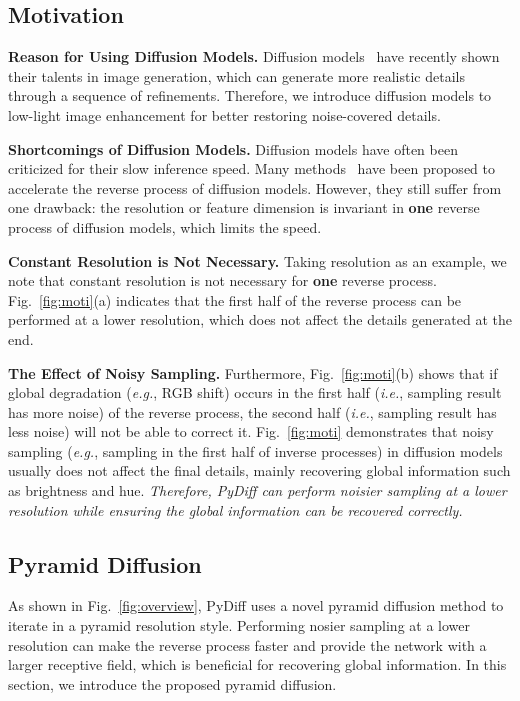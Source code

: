 \documentclass{article}
\def\eg{\emph{e.g.}}
\def\ie{\emph{i.e.}}
\begin{document}
\subsection{Motivation}
\label{PyDiff_moti}
\noindent \textbf{Reason for Using Diffusion Models.}
Diffusion models~\cite{ho2020denoising,song2020score} have recently shown their talents in image generation, which can generate more realistic details through a sequence of refinements. Therefore, we introduce diffusion models to low-light image enhancement for better restoring noise-covered details.



\noindent \textbf{Shortcomings of Diffusion Models.}
Diffusion models have often been criticized for their slow inference speed. Many methods~\cite{song2020denoising,nichol2021improved,ho2022cascaded,saharia2022image} have been proposed to accelerate the reverse process of diffusion models. However, they still suffer from one drawback: the resolution or feature dimension is invariant in \textbf{one} reverse process of diffusion models, which limits the speed.


\noindent \textbf{Constant Resolution is Not Necessary.}
Taking resolution as an example, we note that constant resolution is not necessary for \textbf{one} reverse process. Fig.~\ref{fig:moti}(a) indicates that the first half of the reverse process can be performed at a lower resolution, which does not affect the details generated at the end. 

\noindent \textbf{The Effect of Noisy Sampling.}
Furthermore, Fig.~\ref{fig:moti}(b) shows that if global degradation (\eg, RGB shift) occurs in the first half (\ie, sampling result has more noise) of the reverse process, the second half (\ie, sampling result has less noise) will not be able to correct it. Fig.~\ref{fig:moti} demonstrates that noisy sampling (\eg, sampling in the first half of inverse processes) in diffusion models usually does not affect the final details, mainly recovering global information such as brightness and hue. \emph{Therefore, PyDiff can perform noisier sampling at a lower resolution while ensuring the global information can be recovered correctly.}



\subsection{Pyramid Diffusion}
As shown in Fig.~\ref{fig:overview}, PyDiff uses a novel pyramid diffusion method to iterate in a pyramid resolution style. Performing nosier sampling at a lower resolution can make the reverse process faster and provide the network with a larger receptive field, which is beneficial for recovering global information. In this section, we introduce the proposed pyramid diffusion.
\end{document}
